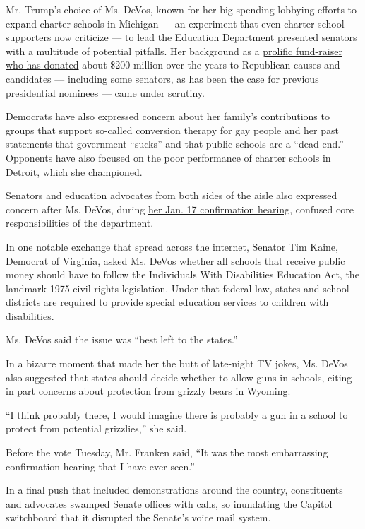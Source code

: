 Mr. Trump's choice of Ms. DeVos, known for her big-spending lobbying
efforts to expand charter schools in Michigan --- an experiment that
even charter school supporters now criticize --- to lead the Education
Department presented senators with a multitude of potential pitfalls.
Her background as a
\href{https://www.nytimes.com/2017/01/09/us/politics/betsy-devos-education-secretary.html}{prolific
fund-raiser who has donated} about \$200 million over the years to
Republican causes and candidates --- including some senators, as has
been the case for previous presidential nominees --- came under
scrutiny.

Democrats have also expressed concern about her family's contributions
to groups that support so-called conversion therapy for gay people and
her past statements that government ``sucks'' and that public schools
are a ``dead end.'' Opponents have also focused on the poor performance
of charter schools in Detroit, which she championed.

Senators and education advocates from both sides of the aisle also
expressed concern after Ms. DeVos, during
\href{https://www.nytimes.com/2017/01/17/us/politics/betsy-devos-education-senate-hearing.html}{her
Jan. 17 confirmation hearing}, confused core responsibilities of the
department.

In one notable exchange that spread across the internet, Senator Tim
Kaine, Democrat of Virginia, asked Ms. DeVos whether all schools that
receive public money should have to follow the Individuals With
Disabilities Education Act, the landmark 1975 civil rights legislation.
Under that federal law, states and school districts are required to
provide special education services to children with disabilities.

Ms. DeVos said the issue was ``best left to the states.''

In a bizarre moment that made her the butt of late-night TV jokes, Ms.
DeVos also suggested that states should decide whether to allow guns in
schools, citing in part concerns about protection from grizzly bears in
Wyoming.

``I think probably there, I would imagine there is probably a gun in a
school to protect from potential grizzlies,'' she said.

Before the vote Tuesday, Mr. Franken said, ``It was the most
embarrassing confirmation hearing that I have ever seen.''

In a final push that included demonstrations around the country,
constituents and advocates swamped Senate offices with calls, so
inundating the Capitol switchboard that it disrupted the Senate's voice
mail system.

